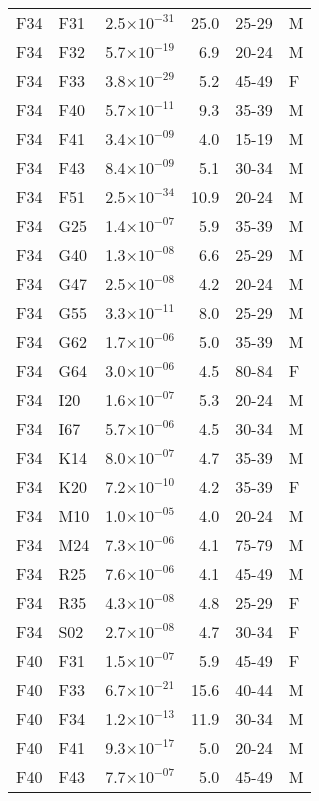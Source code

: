 \begin{longtable}{lllrll}
   F34 & F31 & 2.5$\times10^{-31}$ & 25.0 & 25-29 & M \\ 
   F34 & F32 & 5.7$\times10^{-19}$ & 6.9 & 20-24 & M \\ 
   F34 & F33 & 3.8$\times10^{-29}$ & 5.2 & 45-49 & F \\ 
   F34 & F40 & 5.7$\times10^{-11}$ & 9.3 & 35-39 & M \\ 
   F34 & F41 & 3.4$\times10^{-09}$ & 4.0 & 15-19 & M \\ 
   F34 & F43 & 8.4$\times10^{-09}$ & 5.1 & 30-34 & M \\ 
   F34 & F51 & 2.5$\times10^{-34}$ & 10.9 & 20-24 & M \\ 
   F34 & G25 & 1.4$\times10^{-07}$ & 5.9 & 35-39 & M \\ 
   F34 & G40 & 1.3$\times10^{-08}$ & 6.6 & 25-29 & M \\ 
   F34 & G47 & 2.5$\times10^{-08}$ & 4.2 & 20-24 & M \\ 
   F34 & G55 & 3.3$\times10^{-11}$ & 8.0 & 25-29 & M \\ 
   F34 & G62 & 1.7$\times10^{-06}$ & 5.0 & 35-39 & M \\ 
   F34 & G64 & 3.0$\times10^{-06}$ & 4.5 & 80-84 & F \\ 
   F34 & I20 & 1.6$\times10^{-07}$ & 5.3 & 20-24 & M \\ 
   F34 & I67 & 5.7$\times10^{-06}$ & 4.5 & 30-34 & M \\ 
   F34 & K14 & 8.0$\times10^{-07}$ & 4.7 & 35-39 & M \\ 
   F34 & K20 & 7.2$\times10^{-10}$ & 4.2 & 35-39 & F \\ 
   F34 & M10 & 1.0$\times10^{-05}$ & 4.0 & 20-24 & M \\ 
   F34 & M24 & 7.3$\times10^{-06}$ & 4.1 & 75-79 & M \\ 
   F34 & R25 & 7.6$\times10^{-06}$ & 4.1 & 45-49 & M \\ 
   F34 & R35 & 4.3$\times10^{-08}$ & 4.8 & 25-29 & F \\ 
   F34 & S02 & 2.7$\times10^{-08}$ & 4.7 & 30-34 & F \\ 
   F40 & F31 & 1.5$\times10^{-07}$ & 5.9 & 45-49 & F \\ 
   F40 & F33 & 6.7$\times10^{-21}$ & 15.6 & 40-44 & M \\ 
   F40 & F34 & 1.2$\times10^{-13}$ & 11.9 & 30-34 & M \\ 
   F40 & F41 & 9.3$\times10^{-17}$ & 5.0 & 20-24 & M \\ 
   F40 & F43 & 7.7$\times10^{-07}$ & 5.0 & 45-49 & M \\ 

\end{longtable}
